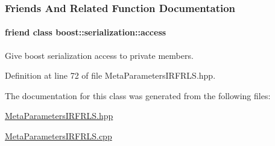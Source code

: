 \subsubsection{Friends And Related Function Documentation}
\hypertarget{classDmpBbo_1_1MetaParametersIRFRLS_ac98d07dd8f7b70e16ccb9a01abf56b9c}{
\paragraph[{boost\+::serialization\+::access}]{\setlength{\rightskip}{0pt plus 5cm}friend class boost\+::serialization\+::access\hspace{0.3cm}{\ttfamily [friend]}}}\label{classDmpBbo_1_1MetaParametersIRFRLS_ac98d07dd8f7b70e16ccb9a01abf56b9c}


Give boost serialization access to private members. 



Definition at line 72 of file Meta\+Parameters\+I\+R\+F\+R\+L\+S.\+hpp.



The documentation for this class was generated from the following files\+:\begin{DoxyCompactItemize}
\item 
\hyperlink{MetaParametersIRFRLS_8hpp}{Meta\+Parameters\+I\+R\+F\+R\+L\+S.\+hpp}\item 
\hyperlink{MetaParametersIRFRLS_8cpp}{Meta\+Parameters\+I\+R\+F\+R\+L\+S.\+cpp}\end{DoxyCompactItemize}
